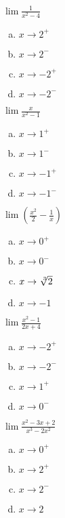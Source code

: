 $\lim \tfrac{1}{x^2-4}$
\begin{multicols}{4}
\begin{enumerate}[a.]
\item
$x\to 2^+$
\item
$x\to 2^-$
\item
$x\to -2^+$
\item
$x\to -2^-$
\end{enumerate}
\end{multicols}
$\lim\tfrac{x}{x^2-1}$
\begin{multicols}{4}
\begin{enumerate}[a.]
\item
$x\to 1^+$
\item
$x\to 1^-$
\item
$x\to -1^+$
\item
$x\to -1^-$
\end{enumerate}
\end{multicols}
$\lim(\tfrac{x^2}{2}-\tfrac{1}{x})$
\begin{multicols}{4}
\begin{enumerate}[a.]
\item
$x\to 0^+$
\item
$x\to 0^-$
\item
$x\to \sqrt[\leftroot{-2}3]{2}$
\item
$x\to -1$
\end{enumerate}
\end{multicols}
$\lim\tfrac{x^2-1}{2x+4}$
\begin{multicols}{4}
\begin{enumerate}[a.]
\item
$x\to -2^+$
\item
$x\to -2^-$
\item
$x\to 1^+$
\item
$x\to 0^-$
\end{enumerate}
\end{multicols}
$\lim\tfrac{x^2-3x+2}{x^3-2x^2}$
\begin{multicols}{4}
\begin{enumerate}[a.]
\item
$x\to 0^+$
\item
$x\to 2^+$
\item
$x\to 2^-$
\item
$x\to 2$
\end{enumerate}
\end{multicols}
